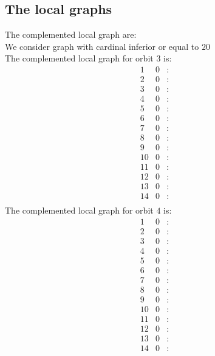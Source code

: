 \documentclass[12pt]{article}
\begin{document}
\subsection{The local graphs}
The complemented local graph are:\\
We consider graph with cardinal inferior or equal to $20$\\
The complemented local graph for orbit $3$ is:
\begin{equation*}
\begin{array}{rrcl}
1&0&:&\\
2&0&:&\\
3&0&:&\\
4&0&:&\\
5&0&:&\\
6&0&:&\\
7&0&:&\\
8&0&:&\\
9&0&:&\\
10&0&:&\\
11&0&:&\\
12&0&:&\\
13&0&:&\\
14&0&:&\\
\end{array}
\end{equation*}
The complemented local graph for orbit $4$ is:
\begin{equation*}
\begin{array}{rrcl}
1&0&:&\\
2&0&:&\\
3&0&:&\\
4&0&:&\\
5&0&:&\\
6&0&:&\\
7&0&:&\\
8&0&:&\\
9&0&:&\\
10&0&:&\\
11&0&:&\\
12&0&:&\\
13&0&:&\\
14&0&:&\\
\end{array}
\end{equation*}
\end{document}
